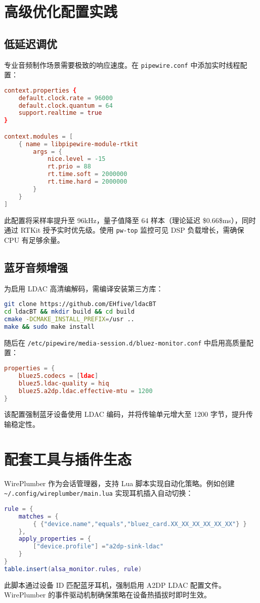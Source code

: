 \chapter{高级优化配置实践}
\section{低延迟调优}
专业音频制作场景需要极致的响应速度。在 \verb!pipewire.conf! 中添加实时线程配置：\par
\begin{lstlisting}[language=conf]
context.properties {
    default.clock.rate = 96000
    default.clock.quantum = 64
    support.realtime = true
}

context.modules = [
    { name = libpipewire-module-rtkit
        args = {
            nice.level = -15
            rt.prio = 88
            rt.time.soft = 2000000
            rt.time.hard = 2000000
        }
    }
]
\end{lstlisting}
此配置将采样率提升至 96kHz，量子值降至 64 样本（理论延迟 \${}0.66\${}ms），同时通过 RTKit 授予实时优先级。使用 \verb!pw-top! 监控可见 DSP 负载增长，需确保 CPU 有足够余量。\par
\section{蓝牙音频增强}
为启用 LDAC 高清编解码，需编译安装第三方库：\par
\begin{lstlisting}[language=bash]
git clone https://github.com/EHfive/ldacBT
cd ldacBT && mkdir build && cd build
cmake -DCMAKE_INSTALL_PREFIX=/usr ..
make && sudo make install
\end{lstlisting}
随后在 \verb!/etc/pipewire/media-session.d/bluez-monitor.conf! 中启用高质量配置：\par
\begin{lstlisting}[language=conf]
properties = {
    bluez5.codecs = [ldac]
    bluez5.ldac-quality = hiq
    bluez5.a2dp.ldac.effective-mtu = 1200
}
\end{lstlisting}
该配置强制蓝牙设备使用 LDAC 编码，并将传输单元增大至 1200 字节，提升传输稳定性。\par
\chapter{配套工具与插件生态}
WirePlumber 作为会话管理器，支持 Lua 脚本实现自动化策略。例如创建 \verb!~/.config/wireplumber/main.lua! 实现耳机插入自动切换：\par
\begin{lstlisting}[language=lua]
rule = {
    matches = {
        { {"device.name","equals","bluez_card.XX_XX_XX_XX_XX_XX"} }
    },
    apply_properties = {
        ["device.profile"] ="a2dp-sink-ldac"
    }
}
table.insert(alsa_monitor.rules, rule)
\end{lstlisting}
此脚本通过设备 ID 匹配蓝牙耳机，强制启用 A2DP LDAC 配置文件。WirePlumber 的事件驱动机制确保策略在设备热插拔时即时生效。\par
